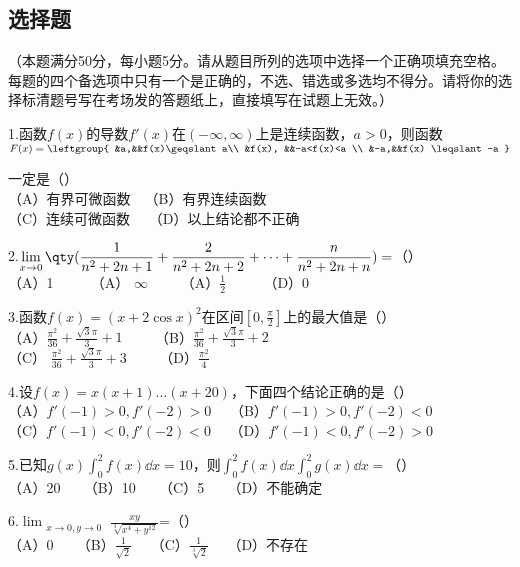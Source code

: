 


\subsection{选择题}（本题满分50分，每小题5分。请从题目所列的选项中选择一个正确项填充空格。每题的四个备选项中只有一个是正确的，不选、错选或多选均不得分。请将你的选择标清题号写在考场发的答题纸上，直接填写在试题上无效。）

1.函数$f(x)$的导数$f'(x)$在$(-\infty,\infty)$上是连续函数，$a>0$，则函数$F(x)=\leftgroup{
&a,&&f(x)\geqslant a\\ 
&f(x), &&-a<f(x)<a \\
&-a,&&f(x) \leqslant -a }$

一定是（）\\
（A）有界可微函数$\quad$（B）有界连续函数 \\
（C）连续可微函数$\quad$ （D）以上结论都不正确

2.$\displaystyle \lim_{\substack{x \to 0}}\qty(\frac{1}{n^2+2n+1}+\frac{2}{n^2+2n+2}+\dots+\frac{n}{n^2+2n+n})=$（）\\
（A）1 $\qquad$ （A） $ \infty \qquad$  （A）$\frac{1}{2}$ $\qquad$   （D）0

3.函数$f(x)=(x+2\cos x)^2$在区间$[0,\frac{\pi}{2}]$上的最大值是（）\\
（A）$\frac{\pi ^2}{36}+\frac{\sqrt{3}\pi}{3}+1 \qquad$     （B）$\frac{\pi ^2}{36}+\frac{\sqrt{3}\pi}{3}+2 \qquad$  \\
（C） $\frac{\pi ^2}{36}+\frac{\sqrt{3}\pi}{3}+3\qquad$       （D）$\frac{\pi^2}{4} \qquad$  

4.设$f(x)=x(x+1)\dots(x+20)$，下面四个结论正确的是（）\\
（A）$f'(-1)>0,f'(-2)>0\quad$ （B）$f'(-1)>0,f'(-2)<0\quad$ \\
（C）$f'(-1)<0,f'(-2)<0\quad$ （D）$f'(-1)<0,f'(-2)>0$

5.已知$\displaystyle g(x)\int_{0}^{2} f(x)\dd{x}=10$，则$\displaystyle \int_{0}^{2} f(x)\dd{x} \int_{0}^{2} g(x)\dd{x}=$（）\\
（A）20 $\quad$ （B）10 $\quad$ （C）5 $\quad$ （D）不能确定

6.$ \displaystyle \lim_{\substack{x \to 0,y \to 0}} \frac{xy}{\sqrt[3]{x^4+y^{12}}}$=（）\\
（A）0 $\quad$ （B）$\frac{1}{\sqrt{2}} \quad$ （C）$ \frac{1}{\sqrt[3]{2}}\quad$ （D）不存在  


